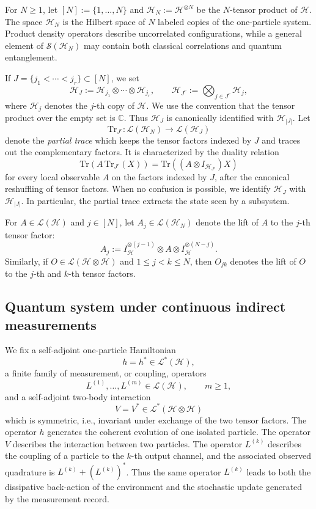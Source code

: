 \documentclass[10pt,a4paper,reqno]{amsart}
\numberwithin{equation}{section}
\theoremstyle{plain}
\theoremstyle{definition}
\theoremstyle{remark}
\newcommand{\Tr}{\mathrm{Tr}}
\newcommand{\cS}{\mathcal S}
\newcommand{\cL}{\mathcal L}
\newcommand{\HH}{\mathcal H}
\newcommand{\1}{\mathbf 1}
\begin{document}
\medskip

For $N\ge1$, let
\(
  [N]:=\{1,\ldots,N\}
\) 
and
  \(
  \HH_N:=\HH^{\otimes N}
\)
be the $N$-tensor product of $\HH$.  The space \(\HH_N\) is the Hilbert space of \(N\) labeled copies of the
one-particle system.  Product density operators describe uncorrelated
configurations, while a general element of $\cS(\HH_N)$ may contain both
classical correlations and quantum entanglement.  

\medskip

If \(J=\{j_1<\cdots<j_r\}\subset[N]\), we set
\[
  \HH_J
  :=
  \HH_{j_1}\otimes\cdots\otimes\HH_{j_r},
  \qquad
  \HH_{J^c}
  :=
  \bigotimes_{j\in J^c} \HH_j,
\]
where \(\HH_j\) denotes the \(j\)-th copy of \(\HH\). We use
the convention that the tensor product over the empty set is \(\mathbb C\).
Thus \(\HH_J\) is canonically identified with \(\HH_{|J|}\).  Let 
\[
  \Tr_{J^c}:
  \cL(\HH_N)
  \longrightarrow
  \cL(\HH_{J})
\]
denote the \emph{partial trace}  which keeps the tensor factors indexed by $J$ and
traces out the complementary factors.  It is characterized by the duality
relation
\[
  \Tr\left(
    A\,\Tr_{J^c}(X)
  \right)
  =
  \Tr\left(
    (A\otimes I_{\HH_{J^c}})X
  \right)
\]
for every local observable $A$ on the factors indexed by $J$, after the
canonical reshuffling of tensor factors.  When no confusion is possible, we identify \(\HH_J\) with
\(\HH_{|J|}\).  In particular, the partial trace
extracts the state seen by a subsystem.

\medskip

For $A\in\cL(\HH)$ and $j\in[N]$, let $A_j\in\cL(\HH_N)$ denote the lift
of $A$ to the $j$-th tensor factor:
\[
  A_j
  :=
  I_{\HH}^{\otimes(j-1)}
  \otimes A\otimes
  I_{\HH}^{\otimes(N-j)}.
\]
Similarly, if $O \in\cL(\HH\otimes\HH)$ and $1\le j<k\le N$, then
$O_{jk}$ denotes the lift of $O$ to the $j$-th and $k$-th tensor
factors.



\subsection{Quantum system under continuous indirect measurements}
\label{subsec:continuously-monitored-systems}





We fix a self-adjoint one-particle Hamiltonian
\[
  h=h^*\in\cL^*(\HH),
\]
a finite family of measurement,  or coupling,  operators
\[
  L^{(1)},\ldots,L^{(m)}\in\cL(\HH),
  \qquad
  m\ge1,
\]
and a self-adjoint two-body  interaction
\[
  V=V^*\in\cL^*(\HH\otimes\HH)
\]
which is symmetric,  i.e.,   invariant under exchange of the two tensor factors.  The operator
\(h\) generates the coherent evolution of one isolated particle.  The operator
\(V\) describes the interaction between two particles.  The operator
\(L^{(k)}\) describes the coupling of a particle to the \(k\)-th output
channel,  and the associated observed quadrature is
\(L^{(k)}+(L^{(k)})^*\).  Thus the same operator \(L^{(k)}\) leads to  both
the dissipative back-action of the environment and the stochastic update
generated by the measurement record.
\end{document}
